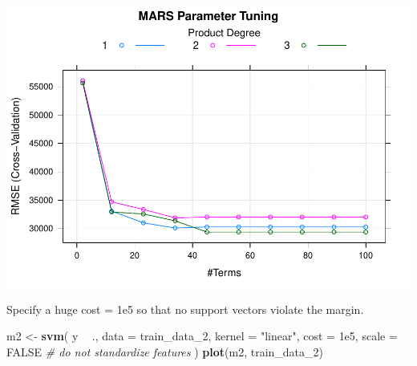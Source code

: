 \documentclass[
]{book}
\newenvironment{Shaded}{\begin{snugshade}}{\end{snugshade}}
\newcommand{\CommentTok}[1]{\textcolor[rgb]{0.56,0.35,0.01}{\textit{#1}}}
\newcommand{\DataTypeTok}[1]{\textcolor[rgb]{0.13,0.29,0.53}{#1}}
\newcommand{\DecValTok}[1]{\textcolor[rgb]{0.00,0.00,0.81}{#1}}
\newcommand{\FloatTok}[1]{\textcolor[rgb]{0.00,0.00,0.81}{#1}}
\newcommand{\KeywordTok}[1]{\textcolor[rgb]{0.13,0.29,0.53}{\textbf{#1}}}
\newcommand{\NormalTok}[1]{#1}
\newcommand{\OperatorTok}[1]{\textcolor[rgb]{0.81,0.36,0.00}{\textbf{#1}}}
\newcommand{\OtherTok}[1]{\textcolor[rgb]{0.56,0.35,0.01}{#1}}
\newcommand{\StringTok}[1]{\textcolor[rgb]{0.31,0.60,0.02}{#1}}
\begin{document}
\begin{Shaded}
\end{Shaded}

\includegraphics{data-sci_files/figure-latex/unnamed-chunk-125-1.pdf}

Specify a huge cost = 1e5 so that no support vectors violate the margin.

\begin{Shaded}
\begin{Highlighting}[]
\NormalTok{m2 <-}\StringTok{ }\KeywordTok{svm}\NormalTok{(}
\NormalTok{  y }\OperatorTok{~}\StringTok{ }\NormalTok{., }
  \DataTypeTok{data =}\NormalTok{ train_data_}\DecValTok{2}\NormalTok{,}
  \DataTypeTok{kernel =} \StringTok{"linear"}\NormalTok{,}
  \DataTypeTok{cost =} \FloatTok{1e5}\NormalTok{,}
  \DataTypeTok{scale =} \OtherTok{FALSE}  \CommentTok{# do not standardize features}
\NormalTok{)}
\KeywordTok{plot}\NormalTok{(m2, train_data_}\DecValTok{2}\NormalTok{)}
\end{Highlighting}
\end{Shaded}
\end{document}
